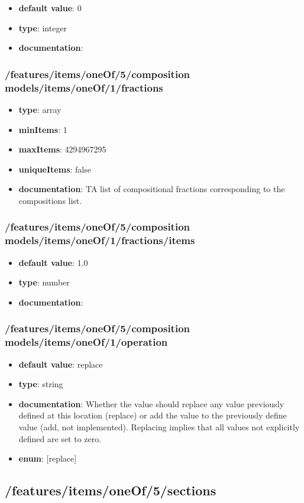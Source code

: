\begin{itemize}\item {\bf default value}: 0
\item {\bf type}: integer
\item {\bf documentation}: 
\end{itemize}\subsubsection{/features/items/oneOf/5/composition models/items/oneOf/1/fractions}
\begin{itemize}\item {\bf type}: array
\item {\bf minItems}: 1
\item {\bf maxItems}: 4294967295
\item {\bf uniqueItems}: false
\item {\bf documentation}: TA list of compositional fractions corresponding to the compositions list.
\end{itemize}\subsubsection{/features/items/oneOf/5/composition models/items/oneOf/1/fractions/items}
\begin{itemize}\item {\bf default value}: 1.0
\item {\bf type}: number
\item {\bf documentation}: 
\end{itemize}\subsubsection{/features/items/oneOf/5/composition models/items/oneOf/1/operation}
\begin{itemize}\item {\bf default value}: replace
\item {\bf type}: string
\item {\bf documentation}: Whether the value should replace any value previously defined at this location (replace) or add the value to the previously define value (add, not implemented). Replacing implies that all values not explicitly defined are set to zero.
\item {\bf enum}: [replace]\end{itemize}\subsection{/features/items/oneOf/5/sections}
